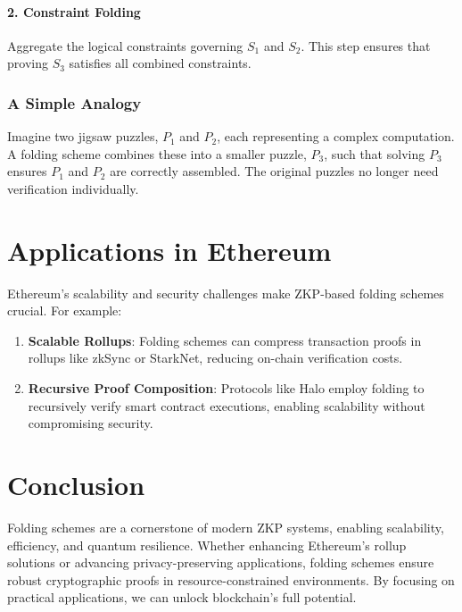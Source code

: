 \documentclass[12pt]{article}
\begin{document}
	\paragraph*{2. Constraint Folding}
	Aggregate the logical constraints governing \( S_1 \) and \( S_2 \). This step ensures that proving \( S_3 \) satisfies all combined constraints.
	
	\subsubsection*{A Simple Analogy}
	Imagine two jigsaw puzzles, \( P_1 \) and \( P_2 \), each representing a complex computation. A folding scheme combines these into a smaller puzzle, \( P_3 \), such that solving \( P_3 \) ensures \( P_1 \) and \( P_2 \) are correctly assembled. The original puzzles no longer need verification individually.
	
	\section*{Applications in Ethereum}
	
	Ethereum’s scalability and security challenges make ZKP-based folding schemes crucial. For example:
	
	\begin{enumerate}
		\item \textbf{Scalable Rollups}: Folding schemes can compress transaction proofs in rollups like zkSync or StarkNet, reducing on-chain verification costs.
		\item \textbf{Recursive Proof Composition}: Protocols like Halo employ folding to recursively verify smart contract executions, enabling scalability without compromising security.
	\end{enumerate}
	
	\section*{Conclusion}
	
	Folding schemes are a cornerstone of modern ZKP systems, enabling scalability, efficiency, and quantum resilience. Whether enhancing Ethereum’s rollup solutions or advancing privacy-preserving applications, folding schemes ensure robust cryptographic proofs in resource-constrained environments. By focusing on practical applications, we can unlock blockchain's full potential.
	
\end{document}
